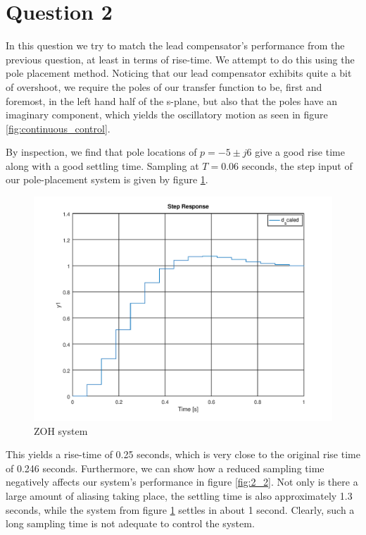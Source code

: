 \documentclass[a4paper, 12pt]{article}
\begin{document}

\section{Question 2}

In this question we try to match the lead compensator's performance from the
previous question, at least in terms of rise-time. We attempt to do this using
the pole placement method. Noticing that our lead compensator exhibits quite a
bit of overshoot, we require the poles of our transfer function to be, first
and foremost, in the left hand half of the s-plane, but also that the poles
have an imaginary component, which yields the oscillatory motion as seen in
figure \ref{fig:continuous_control}.

By inspection, we find that pole locations of $p = -5 \pm j6$ give a good rise
time along with a good settling time. Sampling at $T = 0.06$ seconds, the step
input of our pole-placement system is given by figure \ref{fig:2_1}.

\begin{figure}[H]
	\centering
	\includegraphics[width=\textwidth]{./img/2_1.png}
	\caption{ZOH system}
	\label{fig:2_1}
\end{figure}

This yields a rise-time of 0.25 seconds, which is very close to the original
rise time of 0.246 seconds. Furthermore, we can show how a reduced sampling
time negatively affects our system's performance in figure \ref{fig:2_2}. Not
only is there a large amount of aliasing taking place, the settling time is
also approximately 1.3 seconds, while the system from figure \ref{fig:2_1}
settles in about 1 second. Clearly, such a long sampling time is not adequate
to control the system.
\end{document}
